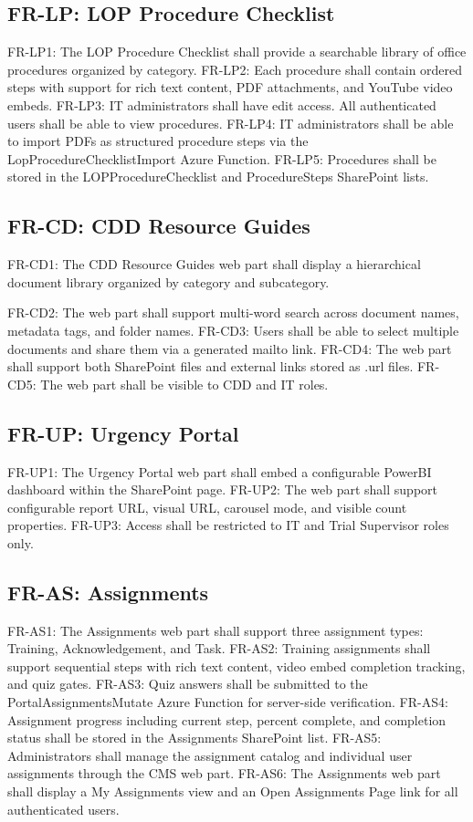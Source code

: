\documentclass[12pt]{article}
\begin{document}
\subsection*{FR-LP: LOP Procedure Checklist}

FR-LP1: The LOP Procedure Checklist shall provide a searchable library of office procedures organized by category. FR-LP2: Each procedure shall contain ordered steps with support for rich text content, PDF attachments, and YouTube video embeds. FR-LP3: IT administrators shall have edit access. All authenticated users shall be able to view procedures. FR-LP4: IT administrators shall be able to import PDFs as structured procedure steps via the LopProcedureChecklistImport Azure Function. FR-LP5: Procedures shall be stored in the LOPProcedureChecklist and ProcedureSteps SharePoint lists.

\subsection*{FR-CD: CDD Resource Guides}

FR-CD1: The CDD Resource Guides web part shall display a hierarchical document library organized by category and subcategory.

FR-CD2: The web part shall support multi-word search across document names, metadata tags, and folder names. FR-CD3: Users shall be able to select multiple documents and share them via a generated mailto link. FR-CD4: The web part shall support both SharePoint files and external links stored as .url files. FR-CD5: The web part shall be visible to CDD and IT roles.

\subsection*{FR-UP: Urgency Portal}

FR-UP1: The Urgency Portal web part shall embed a configurable PowerBI dashboard within the SharePoint page. FR-UP2: The web part shall support configurable report URL, visual URL, carousel mode, and visible count properties. FR-UP3: Access shall be restricted to IT and Trial Supervisor roles only.

\subsection*{FR-AS: Assignments}

FR-AS1: The Assignments web part shall support three assignment types: Training, Acknowledgement, and Task. FR-AS2: Training assignments shall support sequential steps with rich text content, video embed completion tracking, and quiz gates. FR-AS3: Quiz answers shall be submitted to the PortalAssignmentsMutate Azure Function for server-side verification. FR-AS4: Assignment progress including current step, percent complete, and completion status shall be stored in the Assignments SharePoint list. FR-AS5: Administrators shall manage the assignment catalog and individual user assignments through the CMS web part. FR-AS6: The Assignments web part shall display a My Assignments view and an Open Assignments Page link for all authenticated users.
\end{document}

